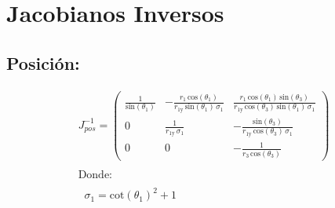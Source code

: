 \documentclass[12pt]{article}
\begin{document}
\newpage

\section{Jacobianos Inversos}
\subsection{Posición:}
\begin{equation*}
\begin{array}{l}
J^{-1}_{pos}=\left(\begin{array}{ccc}
\frac{1}{\mathrm{sin}\left(\theta_1 \right)} & -\frac{r_1 \,\mathrm{cos}\left(\theta_1 \right)}{r_{\textrm{1y}} \,\mathrm{sin}\left(\theta_1 \right)\,\sigma_1 } & \frac{r_1 \,\mathrm{cos}\left(\theta_1 \right)\,\mathrm{sin}\left(\theta_3 \right)}{r_{\textrm{1y}} \,\mathrm{cos}\left(\theta_3 \right)\,\mathrm{sin}\left(\theta_1 \right)\,\sigma_1 }\\
0 & \frac{1}{r_{\textrm{1y}} \,\sigma_1 } & -\frac{\mathrm{sin}\left(\theta_3 \right)}{r_{\textrm{1y}} \,\mathrm{cos}\left(\theta_3 \right)\,\sigma_1 }\\
0 & 0 & -\frac{1}{r_3 \,\mathrm{cos}\left(\theta_3 \right)}
\end{array}\right)\\
\mathrm{}\\
\textrm{Donde:}\\
\mathrm{}\\
\;\;\sigma_1 ={\mathrm{cot}\left(\theta_1 \right)}^2 +1
\end{array}
\label{jacobiano inv pos}    
\end{equation*}
\end{document}
